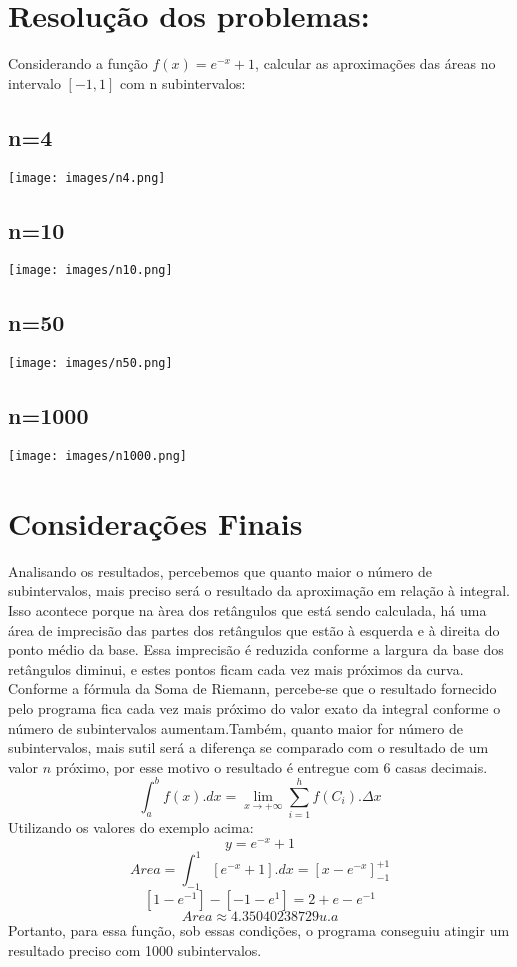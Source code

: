 \documentclass{article}
\begin{document}
	\section{Resolução dos problemas:}
		Considerando a função $f(x) = e^{-x}+1$, calcular as aproximações das áreas no intervalo $[-1,1]$ com n subintervalos:
		\subsection{n=4}
			\texttt{[image: images/n4.png]}
		\subsection{n=10}
			\texttt{[image: images/n10.png]}
		\subsection{n=50}
			\texttt{[image: images/n50.png]}
		\subsection{n=1000}
			\texttt{[image: images/n1000.png]}
	\section{Considerações Finais}
		Analisando os resultados, percebemos que quanto maior o número de subintervalos, mais preciso será o resultado da aproximação em relação à integral. Isso acontece porque na àrea dos retângulos que está sendo calculada, há uma área de imprecisão das partes dos retângulos que estão à esquerda e à direita do ponto médio da base. Essa imprecisão é reduzida conforme a largura da base dos retângulos diminui, e estes pontos ficam cada vez mais próximos da curva. \\
		Conforme a fórmula da Soma de Riemann, percebe-se que o resultado fornecido pelo programa fica cada vez mais próximo do valor exato da integral conforme o número de subintervalos aumentam.Também, quanto maior for número de subintervalos, mais sutil será a diferença se comparado com o resultado de um valor $n$ próximo, por esse motivo o resultado é entregue com 6 casas decimais.
		$$\int_{a}^{b}f(x).dx = \lim_{x\to +\infty}\sum_{i=1}^{h}f(C_i).\Delta x$$
		Utilizando os valores do exemplo acima:\\
		$$y = e^{-x}+1$$
		$$Area = \int_{-1}^{1} [e^{-x}+1].dx=[x-e^{-x}]_{-1}^{+1}$$
		$$[1-e^{-1}]-[-1-e^1]=2+e-e^{-1}$$
		$$Area \approx 4.35040238729 u.a$$
		Portanto, para essa função, sob essas condições, o programa conseguiu atingir um resultado preciso com 1000 subintervalos.
		
\end{document}
